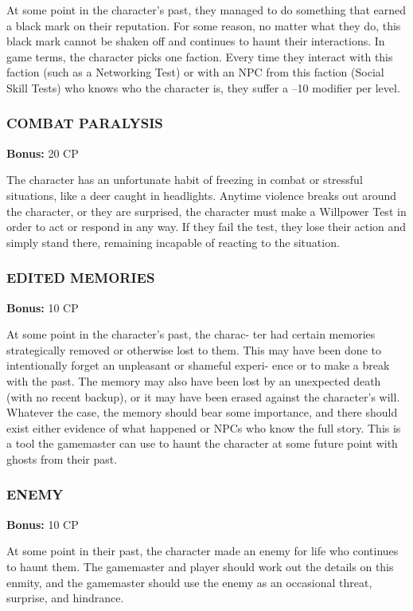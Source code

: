 At some point in the character’s past, they managed
to do something that earned a black mark on their
reputation. For some reason, no matter what they do,
this black mark cannot be shaken off and continues to
haunt their interactions. In game terms, the character
picks one faction. Every time they interact with this
faction (such as a Networking Test) or with an NPC
from this faction (Social Skill Tests) who knows who
the character is, they suffer a –10 modifier per level.

\subsubsection{COMBAT PARALYSIS}
\textbf{Bonus:} 20 CP

The character has an unfortunate habit of freezing
in combat or stressful situations, like a deer caught in
headlights. Anytime violence breaks out around the
character, or they are surprised, the character must
make a Willpower Test in order to act or respond in
any way. If they fail the test, they lose their action and
simply stand there, remaining incapable of reacting to
the situation.

\subsubsection{EDITED MEMORIES}
\textbf{Bonus:} 10 CP

At some point in the character’s past, the charac-
ter had certain memories strategically removed or
otherwise lost to them. This may have been done to
intentionally forget an unpleasant or shameful experi-
ence or to make a break with the past. The memory
may also have been lost by an unexpected death (with
no recent backup), or it may have been erased against
the character’s will. Whatever the case, the memory
should bear some importance, and there should exist
either evidence of what happened or NPCs who know
the full story. This is a tool the gamemaster can use to
haunt the character at some future point with ghosts
from their past.

\subsubsection{ENEMY}
\textbf{Bonus:} 10 CP

At some point in their past, the character made
an enemy for life who continues to haunt them. The
gamemaster and player should work out the details on
this enmity, and the gamemaster should use the enemy
as an occasional threat, surprise, and hindrance.
